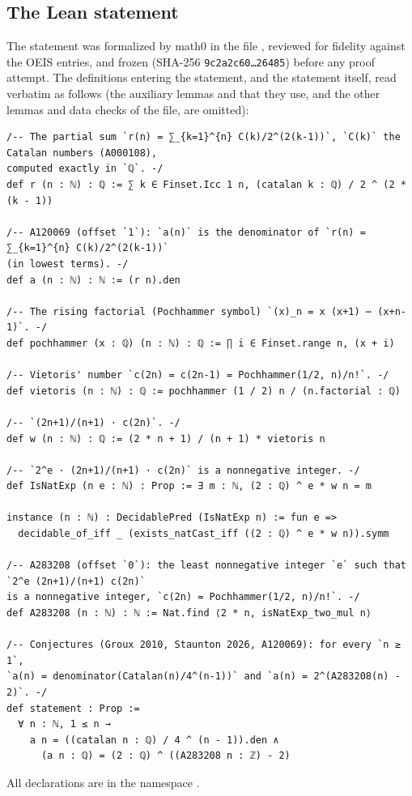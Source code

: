 \documentclass[11pt]{amsart}
\theoremstyle{plain}
\theoremstyle{definition}
\begin{document}
\subsection*{The Lean statement}
The statement was formalized by math0 in the file , reviewed for fidelity against the OEIS entries, and frozen (SHA-256 \texttt{9c2a2c60\ldots26485}) before any proof attempt. The definitions entering the statement, and the statement itself, read verbatim as follows (the auxiliary lemmas  and  that they use, and the other lemmas and data checks of the file, are omitted):
\begin{lstlisting}[basicstyle=\ttfamily\scriptsize]
/-- The partial sum `r(n) = ∑_{k=1}^{n} C(k)/2^(2(k-1))`, `C(k)` the Catalan numbers (A000108),
computed exactly in `ℚ`. -/
def r (n : ℕ) : ℚ := ∑ k ∈ Finset.Icc 1 n, (catalan k : ℚ) / 2 ^ (2 * (k - 1))

/-- A120069 (offset `1`): `a(n)` is the denominator of `r(n) = ∑_{k=1}^{n} C(k)/2^(2(k-1))`
(in lowest terms). -/
def a (n : ℕ) : ℕ := (r n).den

/-- The rising factorial (Pochhammer symbol) `(x)_n = x (x+1) ⋯ (x+n-1)`. -/
def pochhammer (x : ℚ) (n : ℕ) : ℚ := ∏ i ∈ Finset.range n, (x + i)

/-- Vietoris' number `c(2n) = c(2n-1) = Pochhammer(1/2, n)/n!`. -/
def vietoris (n : ℕ) : ℚ := pochhammer (1 / 2) n / (n.factorial : ℚ)

/-- `(2n+1)/(n+1) · c(2n)`. -/
def w (n : ℕ) : ℚ := (2 * n + 1) / (n + 1) * vietoris n

/-- `2^e · (2n+1)/(n+1) · c(2n)` is a nonnegative integer. -/
def IsNatExp (n e : ℕ) : Prop := ∃ m : ℕ, (2 : ℚ) ^ e * w n = m

instance (n : ℕ) : DecidablePred (IsNatExp n) := fun e =>
  decidable_of_iff _ (exists_natCast_iff ((2 : ℚ) ^ e * w n)).symm

/-- A283208 (offset `0`): the least nonnegative integer `e` such that `2^e (2n+1)/(n+1) c(2n)`
is a nonnegative integer, `c(2n) = Pochhammer(1/2, n)/n!`. -/
def A283208 (n : ℕ) : ℕ := Nat.find ⟨2 * n, isNatExp_two_mul n⟩

/-- Conjectures (Groux 2010, Staunton 2026, A120069): for every `n ≥ 1`,
`a(n) = denominator(Catalan(n)/4^(n-1))` and `a(n) = 2^(A283208(n) - 2)`. -/
def statement : Prop :=
  ∀ n : ℕ, 1 ≤ n →
    a n = ((catalan n : ℚ) / 4 ^ (n - 1)).den ∧
      (a n : ℚ) = (2 : ℚ) ^ ((A283208 n : ℤ) - 2)
\end{lstlisting}
All declarations are in the namespace .
\end{document}
